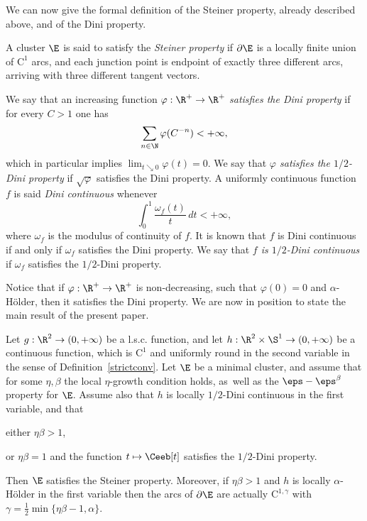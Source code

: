 We can now give the formal definition of the Steiner property, already described above, and of the Dini property.

\begin{defn}\label{defstp}
A cluster $\E$ is said to satisfy the \emph{Steiner property} if $\partial\E$ is a locally finite union of $\mathrm{C}^1$ arcs, and each junction point is endpoint of exactly three different arcs, arriving with three different tangent vectors.
\end{defn}

\begin{defn}
We say that an increasing function $\varphi:\R^+\to\R^+$ \emph{satisfies the Dini property} if for every $C>1$ one has\vspace*{-3pt}
\[
\sum_{n\in\N} \varphi(C^{-n}) < +\infty,
\]
which in particular implies $\lim_{t\searrow 0} \varphi(t)=0$. We say that \emph{$\varphi$ satisfies the $1/2$-Dini property} if $\sqrt{\varphi}$ satisfies the Dini property. A uniformly continuous function $f$ is said \emph{Dini continuous} whenever\vspace*{-3pt}
\[
\int_0^1\frac{\omega_f(t)}t\, dt<+\infty,
\]
where $\omega_f$ is the modulus of continuity of $f$. It is known that $f$ is Dini continuous if and only if $\omega_f$ satisfies the Dini property. We say that \emph{$f$ is $1/2$-Dini continuous} if $\omega_f$ satisfies the $1/2$-Dini property.
\end{defn}

Notice that if $\varphi:\R^+\to\R^+$ is non-decreasing, such that $\varphi(0)=0$ and $\alpha$-H\"older, then it satisfies the Dini property. We are now in position to state the main result of the present paper.

\begin{maintheorem}\label{main}
Let $g:\R^2\to (0,+\infty)$ be a l.s.c. function, and let $h:\R^2\times\S^1\to (0,+\infty)$ be a continuous function, which is $\mathrm{C}^1$ and uniformly round in the second variable in the sense of Definition~\ref{strictconv}. Let $\E$ be a minimal cluster, and assume that for some $\eta,\beta$ the local $\eta$-growth condition holds, as~well as the $\eps-\eps^\beta$ property for $\E$. Assume also that $h$ is locally $1/2$-Dini continuous in the first variable, and that
\begin{enumeratei}
\item\label{maini} either $\eta \beta>1$,
\item\label{mainii} or $\eta\beta=1$ and the function $t \mapsto \Ceeb[t]$ satisfies the $1/2$-Dini property.
\end{enumeratei}
Then $\E$ satisfies the Steiner property. Moreover, if $\eta\beta>1$ and $h$ is locally $\alpha$-H\"older in the first variable then the arcs of $\partial\E$ are actually $\mathrm{C}^{1,\gamma}$ with $\gamma=\frac 12 \min\{\eta\beta-1,\alpha\}$.
\end{maintheorem}

